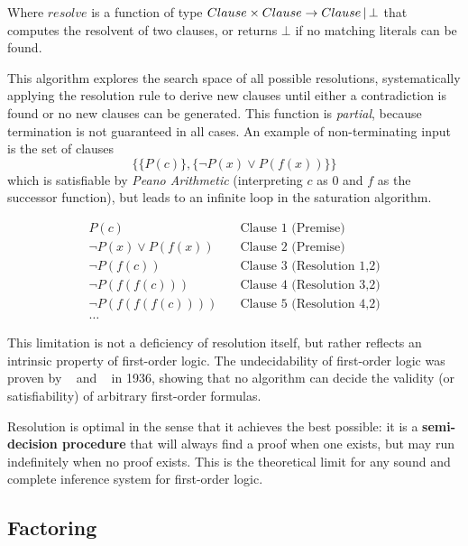 Where \(resolve\) is a function of type \(Clause \times Clause \to Clause\, |\, \bot\) that computes the resolvent of two clauses, or returns \(\bot\) if no matching literals can be found.

This algorithm explores the search space of all possible resolutions, systematically applying the resolution rule to derive new clauses until either a contradiction is found or no new clauses can be generated.
This function is \emph{partial}, because termination is not guaranteed in all cases.
An example of non-terminating input is the set of clauses
\begin{equation}\label{eq:non_terminating}
  \{ \{P(c)\}, \{\neg P(x) \lor P(f(x))\} \}
\end{equation}
which is satisfiable by \textit{Peano Arithmetic} (interpreting \(c\) as \(0\) and \(f\) as the successor function), but leads to an infinite loop in the saturation algorithm.

\begin{equation}
   \begin{aligned}
    P(c) &\quad \text{Clause 1 (Premise)} \\
    \neg P(x) \lor P(f(x)) &\quad \text{Clause 2 (Premise)} \\
    \neg P(f(c)) &\quad \text{Clause 3 (Resolution 1,2)} \\
    \neg P(f(f(c))) &\quad \text{Clause 4 (Resolution 3,2)} \\
    \neg P(f(f(f(c)))) &\quad \text{Clause 5 (Resolution 4,2)}\\
    \ldots
  \end{aligned}
\end{equation}

This limitation is not a deficiency of resolution itself, but rather reflects an intrinsic property of first-order logic. The undecidability of first-order logic was proven by \citeauthor{church1936}~\cite{church1936} and \citeauthor{turing1936}~\cite{turing1936} in 1936, showing that no algorithm can decide the validity (or satisfiability) of arbitrary first-order formulas.

Resolution is optimal in the sense that it achieves the best possible: it is a \textbf{semi-decision procedure} that will always find a proof when one exists, but may run indefinitely when no proof exists. This is the theoretical limit for any sound and complete inference system for first-order logic.

\subsection{Factoring}

